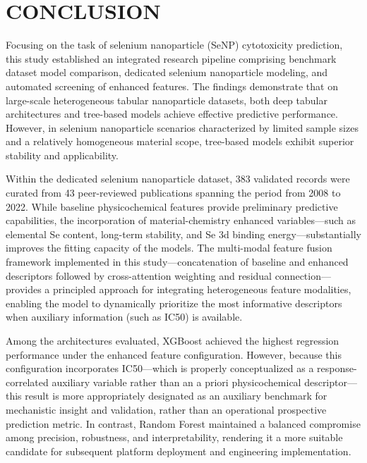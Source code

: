 \section{CONCLUSION}

Focusing on the task of selenium nanoparticle (SeNP) cytotoxicity prediction, this study established an integrated research pipeline comprising benchmark dataset model comparison, dedicated selenium nanoparticle modeling, and automated screening of enhanced features. The findings demonstrate that on large-scale heterogeneous tabular nanoparticle datasets, both deep tabular architectures and tree-based models achieve effective predictive performance. However, in selenium nanoparticle scenarios characterized by limited sample sizes and a relatively homogeneous material scope, tree-based models exhibit superior stability and applicability.

Within the dedicated selenium nanoparticle dataset, 383 validated records were curated from 43 peer-reviewed publications spanning the period from 2008 to 2022. While baseline physicochemical features provide preliminary predictive capabilities, the incorporation of material-chemistry enhanced variables—such as elemental Se content, long-term stability, and Se 3d binding energy—substantially improves the fitting capacity of the models. The multi-modal feature fusion framework implemented in this study—concatenation of baseline and enhanced descriptors followed by cross-attention weighting and residual connection—provides a principled approach for integrating heterogeneous feature modalities, enabling the model to dynamically prioritize the most informative descriptors when auxiliary information (such as IC50) is available.

Among the architectures evaluated, XGBoost achieved the highest regression performance under the enhanced feature configuration. However, because this configuration incorporates IC50—which is properly conceptualized as a response-correlated auxiliary variable rather than an a priori physicochemical descriptor—this result is more appropriately designated as an auxiliary benchmark for mechanistic insight and validation, rather than an operational prospective prediction metric. In contrast, Random Forest maintained a balanced compromise among precision, robustness, and interpretability, rendering it a more suitable candidate for subsequent platform deployment and engineering implementation.

